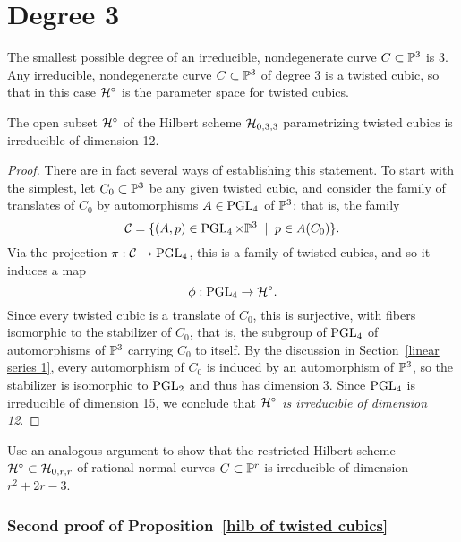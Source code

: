 \section{Degree 3}

The smallest possible degree of an irreducible, nondegenerate curve $C \subset \PP^3$ is 3. Any irreducible, nondegenerate curve $C \subset \PP^3$ of degree 3 is a twisted cubic, so that in this case $\cH^\circ$ is the parameter space for twisted cubics.

\begin{proposition}\label{hilb of twisted cubics}
The open subset $\cH^\circ$ of the Hilbert scheme $\cH_{0,3,3}$ parametrizing twisted cubics is irreducible of dimension 12.
\end{proposition}

\begin{proof}  There are in fact several ways of establishing this statement. To start with the simplest, let $C_0 \subset \PP^3$ be any given twisted cubic, and consider the family of translates of $C_0$ by automorphisms $A \in \PGL_4$ of $\PP^3$: that is, the family
$$
\cC = \{ (A, p) \in \PGL_4 \times \PP^3 \; \mid \; p \in A(C_0) \}.
$$
Via the projection $\pi : \cC \to \PGL_4$, this is a family of twisted cubics, and so it induces a map
$$
\phi : \PGL_4 \to \cH^\circ.
$$
Since every twisted cubic is a translate of $C_0$, this is surjective, with fibers isomorphic to the stabilizer of $C_0$, that is, the subgroup of $\PGL_4$ of automorphisms of $\PP^3$ carrying $C_0$ to itself. By the discussion in Section~\ref{linear series 1}, every automorphism of $C_{0}$ is induced by an automorphism of $\PP^{3}$, so the stabilizer is isomorphic to $\PGL_2$ and  thus has dimension 3. Since $\PGL_4$ is irreducible of dimension 15, we conclude that \emph{$\cH^\circ$ is irreducible of dimension 12}.
\end{proof}

\begin{exercise}\label{rational normal hilbert}
Use an analogous argument to show that the restricted Hilbert scheme $\cH^\circ \subset \cH_{0,r,r}$ of rational normal curves $C \subset \PP^r$ is irreducible of dimension $r^2+2r-3$.
\end{exercise}

\subsubsection{Second proof of Proposition~\ref{hilb of twisted cubics}}


